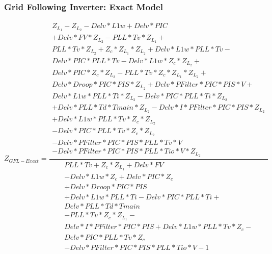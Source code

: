 \subsubsection{Grid Following Inverter: Exact Model}
\begin{center}
\begin{equation}\label{4}
Z_{GFL-Exact}=
\frac
{
\begin{split}
Z_L_1 - Z_L_2 - Delv*L1w + Delv*PIC\\ + Delv*FV*Z_L_2 - PLL*Tv*Z_L_1 +\\ PLL*Tv*Z_L_2 + Z_c*Z_L_1*Z_L_2 + Delv*L1w*PLL*Tv -\\ Delv*PIC*PLL*Tv - Delv*L1w*Z_c*Z_L_2 +\\ Delv*PIC*Z_c*Z_L_2 - PLL*Tv*Z_c*Z_L_1*Z_L_2 +\\ Delv*Droop*PIC*PIS*Z_L_2 +Delv*PFilter*PIC*PIS*V +\\ Delv*L1w*PLL*Ti*Z_L_2 -Delv*PIC*PLL*Ti*Z_L_2\\+ Delv*PLL*Td*Tmain*Z_L_2 - Delv*I*PFilter*PIC*PIS*Z_L_2\\+ Delv*L1w*PLL*Tv*Z_c*Z_L_2\\ - Delv*PIC*PLL*Tv*Z_c*Z_L_2\\ - Delv*PFilter*PIC*PIS*PLL*Tv*V\\ - Delv*PFilter*PIC*PIS*PLL*Tio*V*Z_L_2
\end{split}}
{\begin{split}PLL*Tv + Z_c*Z_L_1 + Delv*FV\\ - Delv*L1w*Z_c + Delv*PIC*Z_c\\+ Delv*Droop*PIC*PIS\\ + Delv*L1w*PLL*Ti - Delv*PIC*PLL*Ti +\\ Delv*PLL*Td*Tmain\\ - PLL*Tv*Z_c*Z_L_1 -\\Delv*I*PFilter*PIC*PIS + Delv*L1w*PLL*Tv*Z_c -\\ Delv*PIC*PLL*Tv*Z_c\\ - Delv*PFilter*PIC*PIS*PLL*Tio*V - 1\end{split}}
\end{equation}
\end{center}


\pagebreak

